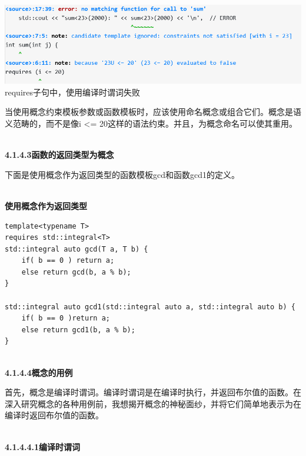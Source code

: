 \begin{center}
\includegraphics[width=1.0\textwidth]{content/3/chapter4/images/1-2.png}\\
requires子句中，使用编译时谓词失败
\end{center}

\begin{tcolorbox}[colback=blue!5!white,colframe=blue!75!black,title={避免在requires子句中使用编译时谓词}]
当使用概念约束模板参数或函数模板时，应该使用命名概念或组合它们。概念是语义范畴的，而不是像i <= 20这样的语法约束。并且，为概念命名可以使其重用。
\end{tcolorbox}

\hspace*{\fill} \\ %
\noindent
\textbf{4.1.4.3\hspace{0.2cm}函数的返回类型为概念}

下面是使用概念作为返回类型的函数模板gcd和函数gcd1的定义。

\hspace*{\fill} \\ %
\noindent
\textbf{使用概念作为返回类型}
\begin{lstlisting}[style=styleCXX]
template<typename T>
requires std::integral<T>
std::integral auto gcd(T a, T b) {
	if( b == 0 ) return a;
	else return gcd(b, a % b);
}

std::integral auto gcd1(std::integral auto a, std::integral auto b) {
	if( b == 0 )return a;
	else return gcd1(b, a % b);
}
\end{lstlisting}

\hspace*{\fill} \\ %
\noindent
\textbf{4.1.4.4\hspace{0.2cm}概念的用例}

首先，概念是编译时谓词。编译时谓词是在编译时执行，并返回布尔值的函数。在深入研究概念的各种用例前，我想揭开概念的神秘面纱，并将它们简单地表示为在编译时返回布尔值的函数。

\hspace*{\fill} \\ %
\noindent
\textbf{4.1.4.4.1\hspace{0.2cm}编译时谓词}

